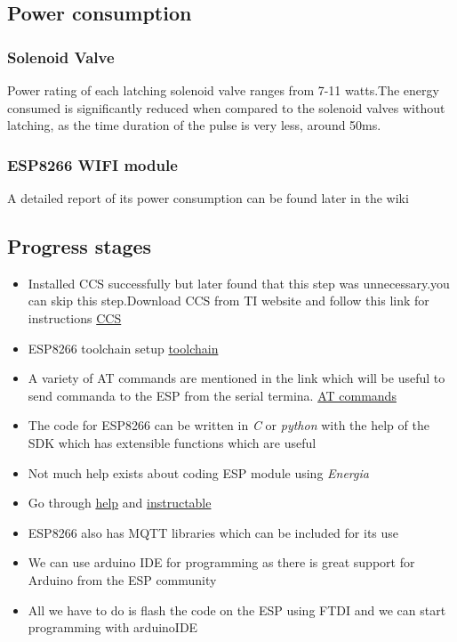 \documentclass[16pt]{article}
\begin{document}
\subsection{Power consumption}



 
\subsubsection{Solenoid Valve}

Power rating of each latching solenoid valve
ranges from 7-11 watts.The energy consumed is significantly reduced when
compared to the solenoid valves without latching, as the time duration
of the pulse is very less, around 50ms.

\subsubsection{ESP8266 WIFI module}

A detailed report of its power consumption can be found later in the
wiki



\subsection{Progress stages}

\begin{itemize}

\item
  Installed CCS successfully but later found that this step was unnecessary.you can skip this step.Download CCS from TI website and follow this link for instructions
  \href{http://processors.wiki.ti.com/index.php/Linux_Host_Support_CCSv6}{CCS}
\item ESP8266 toolchain setup   \href{https://github.com/esp8266/esp8266-wiki/wiki/Toolchain}{toolchain}
\item
  A variety of AT commands are mentioned in the link which will be
  useful to send commanda to the ESP from the serial termina. \href{https://nurdspace.nl/ESP8266#AT_Commands}{AT commands}
\item
  The code for ESP8266 can be written in \emph{C} or \emph{python} with
  the help of the SDK which has extensible functions which are useful
\item
  Not much help exists about coding ESP module using \emph{Energia}
\item Go through \href{http://hackaday.com/2014/12/08/compiling-your-own-programs-for-the-esp8266/}{help} and \href{http://www.instructables.com/id/ESP8266-mini-Tutorial/}{instructable}
\item
  ESP8266 also has MQTT libraries which can be included for its use
\item
  We can use arduino IDE for programming as there is great support for
  Arduino from the ESP community
\item
  All we have to do is flash the code on the ESP using FTDI and we can
  start programming with arduinoIDE
  
\end{itemize}
\end{document}
